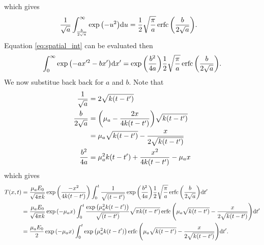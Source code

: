 \documentclass[letterpaper,10pt]{article}
\DeclareMathOperator{\erfc}{erfc}
\begin{document}
    which gives
    \begin{align}
      \frac{1}{\sqrt{a}}
      \int_{\frac{b}{2\sqrt{a}}}^{\infty}
      \exp \qty(-u^2)
      \dd u
  &=
  \frac{1}{2} \sqrt{\frac{\pi}{a}}
  \erfc\qty( \frac{b}{2\sqrt{a}} ).
\end{align}
Equation \ref{eq:spatial_int} can be evaluated then
\begin{equation}
  \int_{0}^{\infty}
  \exp\qty(
  -a x^{\prime 2}
  -b x^{\prime}
  )
  \dd x^\prime
  =
  \exp \qty(\frac{b^2}{4a} )
  \frac{1}{2} \sqrt{\frac{\pi}{a}}
  \erfc\qty( \frac{b}{2\sqrt{a}} ).
\end{equation}
We now substitue back back for $a$ and $b$. Note that
\begin{align}
  \label{eq:beers_law_temp}
  \frac{1}{\sqrt{a}} &= 2\sqrt{k(t-t^\prime)} \\
  \frac{b}{2\sqrt{a}} &= \qty(\mu_a - \frac{2x}{4k(t-t^\prime)})\sqrt{k(t-t^\prime)} \\
                      &= \mu_a \sqrt{k(t-t^\prime)} - \frac{x}{2\sqrt{k(t-t^\prime)}} \\
                      \frac{b^2}{4a} &= \mu_a^2 k(t-t^\prime) + \frac{x^2}{4k(t-t^\prime)} - \mu_a x
                    \end{align}
                    which gives
                    \begin{align}
                      T(x,t) &=
                      \frac{\mu_a E_0}{\sqrt{4\pi k}}
                      \exp\qty(\frac{-x^{2}}{4k(t-t^\prime)} )
                      \int_0^t
                      \frac{1}{\sqrt{(t-t^\prime)}}
                      \exp \qty(\frac{b^2}{4a} )
                      \frac{1}{2} \sqrt{\frac{\pi}{a}}
                      \erfc\qty( \frac{b}{2\sqrt{a}} )
                      \dd t^\prime \\
         &=
         \frac{\mu_a E_0}{\sqrt{4\pi k}}
         \exp\qty(- \mu_a x)
         \int_0^t
         \frac{
           \exp\qty( \mu_a^2 k(t-t^\prime) )
           }{
           \sqrt{(t-t^\prime)}
         }
         \sqrt{\pi k (t - t^\prime)}
         \erfc\qty(
         \mu_a \sqrt{k(t-t^\prime)} - \frac{x}{2\sqrt{k(t-t^\prime)}}
         )
         \dd t^\prime \\
         &=
         \frac{\mu_a E_0}{2}
         \exp\qty(- \mu_a x)
         \int_0^t
         \exp\qty( \mu_a^2 k(t-t^\prime) )
         \erfc\qty(
         \mu_a \sqrt{k(t-t^\prime)} - \frac{x}{2\sqrt{k(t-t^\prime)}}
         )
         \dd t^\prime.
       \end{align}
\end{document}
